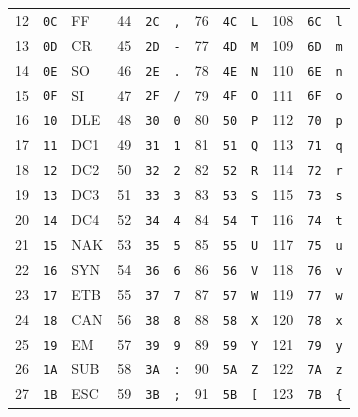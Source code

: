 \begin{center}
\begin{longtable}{@{}rrl@{\qquad}rrl@{\qquad}rrl@{\qquad}rrl@{}}
12 & \texttt{0C} & FF  &  44 & \texttt{2C} & \texttt{,} &  76 & \texttt{4C} & \texttt{L} & 108 & \texttt{6C} & \texttt{l} \\
13 & \texttt{0D} & CR  &  45 & \texttt{2D} & \texttt{-} &  77 & \texttt{4D} & \texttt{M} & 109 & \texttt{6D} & \texttt{m} \\
14 & \texttt{0E} & SO  &  46 & \texttt{2E} & \texttt{.} &  78 & \texttt{4E} & \texttt{N} & 110 & \texttt{6E} & \texttt{n} \\
15 & \texttt{0F} & SI  &  47 & \texttt{2F} & \texttt{/} &  79 & \texttt{4F} & \texttt{O} & 111 & \texttt{6F} & \texttt{o} \\
16 & \texttt{10} & DLE &  48 & \texttt{30} & \texttt{0} &  80 & \texttt{50} & \texttt{P} & 112 & \texttt{70} & \texttt{p} \\
17 & \texttt{11} & DC1 &  49 & \texttt{31} & \texttt{1} &  81 & \texttt{51} & \texttt{Q} & 113 & \texttt{71} & \texttt{q} \\
18 & \texttt{12} & DC2 &  50 & \texttt{32} & \texttt{2} &  82 & \texttt{52} & \texttt{R} & 114 & \texttt{72} & \texttt{r} \\
19 & \texttt{13} & DC3 &  51 & \texttt{33} & \texttt{3} &  83 & \texttt{53} & \texttt{S} & 115 & \texttt{73} & \texttt{s} \\
20 & \texttt{14} & DC4 &  52 & \texttt{34} & \texttt{4} &  84 & \texttt{54} & \texttt{T} & 116 & \texttt{74} & \texttt{t} \\
21 & \texttt{15} & NAK &  53 & \texttt{35} & \texttt{5} &  85 & \texttt{55} & \texttt{U} & 117 & \texttt{75} & \texttt{u} \\
22 & \texttt{16} & SYN &  54 & \texttt{36} & \texttt{6} &  86 & \texttt{56} & \texttt{V} & 118 & \texttt{76} & \texttt{v} \\
23 & \texttt{17} & ETB &  55 & \texttt{37} & \texttt{7} &  87 & \texttt{57} & \texttt{W} & 119 & \texttt{77} & \texttt{w} \\
24 & \texttt{18} & CAN &  56 & \texttt{38} & \texttt{8} &  88 & \texttt{58} & \texttt{X} & 120 & \texttt{78} & \texttt{x} \\
25 & \texttt{19} & EM  &  57 & \texttt{39} & \texttt{9} &  89 & \texttt{59} & \texttt{Y} & 121 & \texttt{79} & \texttt{y} \\
26 & \texttt{1A} & SUB &  58 & \texttt{3A} & \texttt{:} &  90 & \texttt{5A} & \texttt{Z} & 122 & \texttt{7A} & \texttt{z} \\
27 & \texttt{1B} & ESC &  59 & \texttt{3B} & \texttt{;} &  91 & \texttt{5B} & \texttt{[} & 123 & \texttt{7B} & \texttt{\{} \\

\end{longtable}
\end{center}

